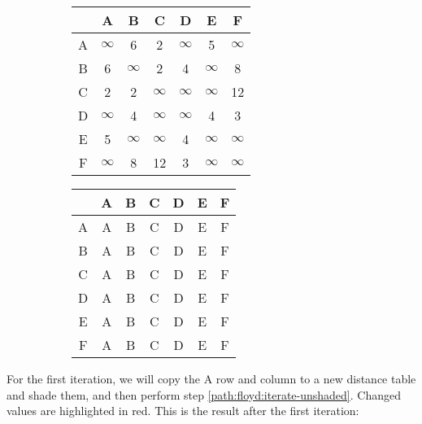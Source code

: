 \documentclass[../main.tex]{subfile}
\begin{document}
\begin{figure}[H]
\hspace{0.03\linewidth}
\begin{minipage}{0.45\linewidth}
	\begin{figure}[H]
		\centering
		{\renewcommand{\arraystretch}{1.15}
		\begin{tabular}{c|c c c c c c}
			& A & B & C & D & E & F\\
			\hline
			A & $\infty$ & 6 & 2 & $\infty$ & 5 & $\infty$\\
			B & 6 & $\infty$ & 2 & 4 & $\infty$ & 8\\
			C & 2 & 2 & $\infty$ & $\infty$ & $\infty$ & 12\\
			D & $\infty$ & 4 & $\infty$ & $\infty$ & 4 & 3\\
			E & 5 & $\infty$ & $\infty$ & 4 & $\infty$ & $\infty$\\
			F & $\infty$ & 8 & 12 & 3 & $\infty$ & $\infty$\\
		\end{tabular}}
	\end{figure}
\end{minipage}\hfill
\begin{minipage}{0.45\linewidth}
	\begin{figure}[H]
		\centering
		{\renewcommand{\arraystretch}{1.15}
		\begin{tabular}{c|c c c c c c}
			& A & B & C & D & E & F\\
			\hline
			A & A & B & C & D & E & F\\
			B & A & B & C & D & E & F\\
			C & A & B & C & D & E & F\\
			D & A & B & C & D & E & F\\
			E & A & B & C & D & E & F\\
			F & A & B & C & D & E & F\\
		\end{tabular}}
	\end{figure}
\end{minipage}
\hspace{0.03\linewidth}
\end{figure}

For the first iteration, we will copy the A row and column to a new distance table and shade them, and then perform step \ref{path:floyd:iterate-unshaded}. Changed values are highlighted in red. This is the result after the first iteration:
\end{document}
